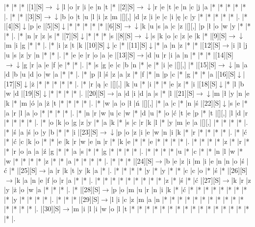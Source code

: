 \documentclass[11pt]{article}
\newcommand\drarr{$\rightarrow \!\!\!\!\! \downarrow$}
\newcommand\rarr{$\rightarrow$}
\newcommand\darr{$\downarrow$}
\begin{document}
\noindent\begin{Puzzle}{25}{22}|*	|*	|*	|[1][S]\drarr	|l	|o	|r	|i	|e	|n	|t	|*	|[2][S]\drarr	|r	|e	|t	|e	|n	|c	|j	|a	|*	|*	|*	|*	|*	|.
|*	|*	|[3][S]\drarr	|b	|o	|t	|u	|l	|i	|z	|m	|[][,]{ }	|d	|z	|i	|e	|c	|i	|ę	|c	|y	|*	|*	|*	|*	|*	|.
|*	|[4][S]\darr	|p	|e	|[5][S]\darr	|*	|*	|*	|*	|*	|[6][S]\drarr	|k	|u	|s	|a	|c	|z	|[][,]{ }	|p	|ł	|o	|w	|y	|*	|*	|*	|.
|*	|n	|r	|z	|s	|*	|[7][S]\darr	|*	|*	|*	|s	|[8][S]\drarr	|s	|k	|o	|c	|z	|e	|k	|*	|[9][S]\drarr	|m	|i	|g	|*	|*	|.
|*	|i	|z	|t	|k	|[10][S]\darr	|c	|*	|[11][S]\darr	|*	|a	|n	|z	|*	|*	|[12][S]\rarr	|i	|l	|j	|u	|s	|z	|y	|n	|*	|*	|.
|*	|e	|e	|r	|o	|a	|e	|[13][S]\rarr	|d	|u	|r	|i	|a	|n	|*	|*	|*	|[14][S]\drarr	|g	|r	|a	|e	|f	|e	|*	|*	|.
|*	|s	|g	|e	|c	|b	|n	|*	|e	|*	|i	|e	|[][,]{ }	|*	|[15][S]\drarr	|n	|a	|d	|b	|u	|d	|o	|w	|a	|*	|*	|.
|*	|p	|l	|ś	|z	|a	|z	|*	|f	|*	|n	|p	|c	|*	|g	|*	|*	|a	|[16][S]\darr	|[17][S]\darr	|ż	|*	|*	|*	|*	|*	|.
|*	|r	|ą	|c	|[][,]{ }	|k	|u	|*	|i	|*	|*	|e	|z	|*	|i	|[18][S]\darr	|*	|l	|b	|w	|d	|[19][S]\darr	|*	|*	|*	|*	|.
|[20][S]\rarr	|a	|d	|i	|d	|a	|s	|*	|l	|[21][S]\drarr	|m	|ł	|y	|n	|e	|k	|*	|m	|ó	|a	|ż	|t	|*	|*	|*	|*	|.
|*	|w	|a	|o	|ł	|ń	|[][,]{ }	|*	|a	|c	|*	|n	|ś	|[22][S]\darr	|s	|e	|*	|a	|r	|l	|a	|o	|*	|*	|*	|*	|.
|*	|n	|r	|w	|u	|c	|w	|*	|d	|u	|*	|o	|ć	|t	|e	|p	|*	|t	|[][,]{ }	|l	|d	|r	|*	|*	|*	|*	|.
|*	|o	|k	|o	|g	|z	|y	|*	|a	|k	|*	|s	|c	|r	|k	|l	|*	|y	|m	|e	|a	|[][,]{ }	|*	|*	|*	|*	|.
|*	|ś	|a	|ś	|o	|y	|b	|*	|*	|i	|[23][S]\drarr	|p	|o	|z	|i	|e	|w	|n	|i	|k	|*	|r	|*	|*	|*	|*	|.
|*	|ć	|*	|ć	|c	|k	|o	|*	|*	|e	|k	|r	|w	|e	|n	|r	|*	|k	|e	|*	|*	|e	|*	|*	|*	|*	|.
|*	|*	|*	|*	|z	|*	|r	|*	|*	|r	|o	|a	|a	|ź	|g	|*	|*	|a	|s	|*	|*	|g	|*	|*	|*	|*	|.
|*	|*	|*	|*	|u	|*	|c	|*	|*	|n	|l	|w	|*	|w	|*	|*	|*	|*	|z	|*	|*	|a	|*	|*	|*	|*	|.
|*	|*	|*	|[24][S]\rarr	|b	|e	|z	|i	|m	|i	|e	|n	|n	|o	|ś	|ć	|*	|[25][S]\rarr	|a	|r	|k	|t	|y	|k	|a	|*	|.
|*	|*	|*	|*	|y	|*	|y	|*	|*	|c	|c	|o	|*	|ś	|*	|[26][S]\rarr	|k	|a	|n	|e	|f	|o	|r	|a	|*	|*	|.
|*	|*	|*	|*	|*	|*	|*	|*	|*	|z	|*	|ś	|*	|ć	|[27][S]\rarr	|k	|r	|z	|y	|ż	|o	|w	|a	|*	|*	|*	|.
|*	|[28][S]\rarr	|p	|o	|m	|u	|r	|n	|i	|k	|*	|ć	|*	|*	|*	|*	|*	|*	|*	|*	|*	|y	|*	|*	|*	|*	|.
|*	|*	|*	|[29][S]\rarr	|l	|i	|c	|z	|m	|a	|n	|*	|*	|*	|*	|*	|*	|*	|*	|*	|*	|*	|*	|*	|*	|*	|.
|[30][S]\rarr	|m	|i	|l	|i	|w	|o	|l	|t	|*	|*	|*	|*	|*	|*	|*	|*	|*	|*	|*	|*	|*	|*	|*	|*	|*	|.\end{Puzzle}

\newpage
\end{document}
